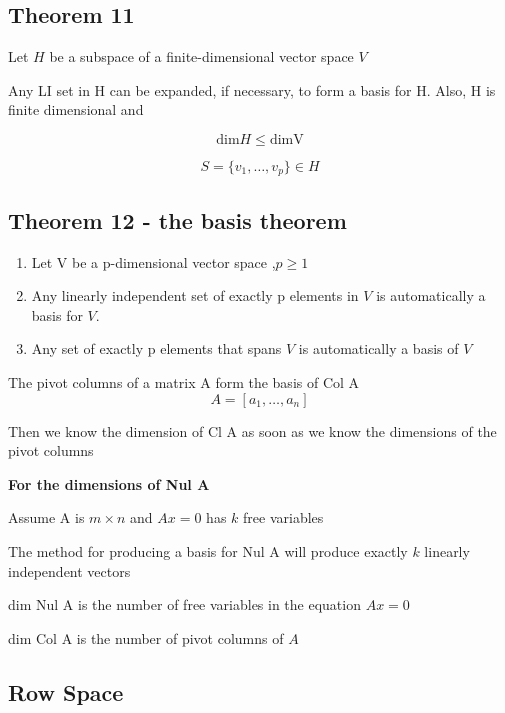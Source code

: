 \subsection{Theorem 11}
Let $H$ be a subspace of a finite-dimensional vector space $V$

Any LI set in H can be expanded, if necessary, to form a basis for H. Also, H is finite dimensional and 

\begin{equation}
	\label{}
	\mbox{dim}H\leq\mbox{dim{V}}
\end{equation}

\begin{equation}
	\label{}
	S=\{v_{1},\ldots,v_{p}\}\in H
\end{equation}


\subsection{Theorem 12 - the basis theorem}

\begin{enumerate}
	\item Let V be a p-dimensional vector space ,$p\geq 1$
	\item Any linearly independent set of exactly p elements in $V$ is automatically a basis for $V$. 
	\item Any set of exactly p elements that spans $V$ is automatically a basis of $V$
\end{enumerate}
 

The pivot columns of a matrix A form the basis of Col A
\begin{equation}
	\label{}
	A=[a_{1},\ldots,a_{n}]
\end{equation}

Then we know the dimension of Cl A as soon as we know the dimensions of the pivot columns

\hfill


\textbf{For the dimensions of Nul A}

Assume A is $m\times n$ and $Ax=0$ has $k$ free variables

The method for producing a basis for Nul A will produce exactly $k$ linearly independent vectors


dim Nul A is the number of free variables in the equation $Ax=0$

dim Col A is the number of pivot columns of $A$

\subsection{Row Space}

